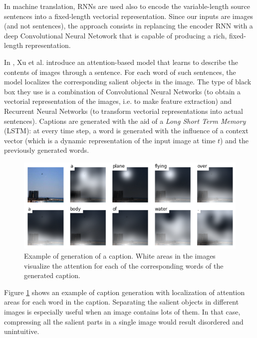 \documentclass[12pt, twoside, a4paper]{report}
\begin{document}
In machine translation, RNNs are used also to encode the variable-length source sentences into a fixed-length vectorial representation. Since our inputs are images (and not sentences), the approach consists in replancing the encoder RNN with a deep Convolutional Neural Netowork that is capable of producing a rich, fixed-length representation.
\bigskip



In \cite{show_attend_and_tell}, Xu et al. introduce an attention-based model that learns to describe the contents of images through a sentence. For each word of such sentences, the model localizes the corresponding salient objects in the image. 
The type of black box they use is a combination of Convolutional Neural Networks (to obtain a vectorial representation of the images, i.e. to make feature extraction) and Recurrent Neural Networks (to transform vectorial representations into actual sentences).
Captions are generated with the aid of a \textit{Long Short Term Memory} (LSTM): at every time step, a word is generated with the influence of a context vector (which is a dynamic representation of the input image at time $t$) and the previously generated words.

\begin{figure}
\includegraphics[width=\linewidth]{images/paper-images/show-attend.png}
\caption{Example of generation of a caption. White areas in the images visualize the attention for each of the corresponding words of the generated caption\protect\footnotemark.}
\label{fig:show-attend}
\end{figure}


Figure \ref{fig:show-attend} shows an example of caption generation with localization of attention areas for each word in the caption. Separating the salient objects in different images is especially useful when an image contains lots of them. In that case, compressing all the salient parts in a single image would result disordered and unintuitive.
\end{document}
